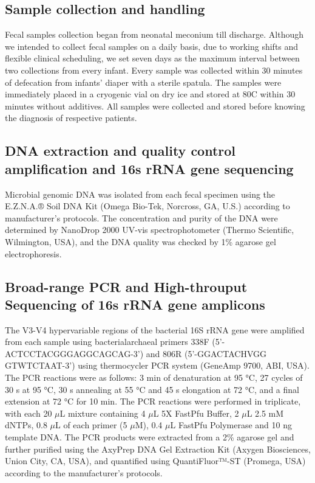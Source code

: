 \documentclass[fleqn,10pt,lineno]{wlpeerj} %
\begin{document}
  \subsection*{Sample collection and handling}
  Fecal samples collection began from neonatal meconium till discharge. Although we intended to collect fecal samples on a daily basis, due to working shifts and flexible clinical scheduling, we set seven days as the maximum interval between two collections from every infant. Every sample was collected within 30 minutes of defecation from infants' diaper with a sterile spatula. The samples were immediately placed in a cryogenic vial on dry ice and stored at 80\textdegree{}C within 30 minutes without additives. All samples were collected and stored before knowing the diagnosis of respective patients.

  \subsection*{DNA extraction and quality control amplification and 16s rRNA gene sequencing}
  Microbial genomic DNA was isolated from each fecal specimen using the E.Z.N.A.® Soil DNA Kit (Omega Bio-Tek, Norcross, GA, U.S.) according to manufacturer’s protocols. The concentration and purity of the DNA were determined by NanoDrop 2000 UV-vis spectrophotometer (Thermo Scientific, Wilmington, USA), and the DNA quality was checked by 1\% agarose gel electrophoresis.

  \subsection*{Broad-range PCR and High-throuput Sequencing of 16s rRNA gene amplicons}
  The V3-V4 hypervariable regions of the bacterial 16S rRNA gene were amplified from each sample using bacterial\/archaeal primers 338F (5’-ACTCCTACGGGAGGCAGCAG-3’) and 806R (5’-GGACTACHVGG GTWTCTAAT-3’) using thermocycler PCR system (GeneAmp 9700, ABI, USA). The PCR reactions were as follows: 3 min of denaturation at 95 °C, 27 cycles of 30 s at 95 °C, 30 s annealing at 55 °C and 45 s elongation at 72 °C, and a final extension at 72 °C for 10 min. The PCR reactions were performed in triplicate, with each 20 $\mu$L mixture containing 4 $\mu$L 5X FastPfu Buffer, 2 $\mu$L 2.5 mM dNTPs, 0.8 $\mu$L of each primer (5 $\mu$M), 0.4 $\mu$L FastPfu Polymerase and 10 ng template DNA. The PCR products were extracted from a 2\% agarose gel and further purified using the AxyPrep DNA Gel Extraction Kit (Axygen Biosciences, Union City, CA, USA), and quantified using QuantiFluor™-ST (Promega, USA) according to the manufacturer’s protocols.
\end{document}
